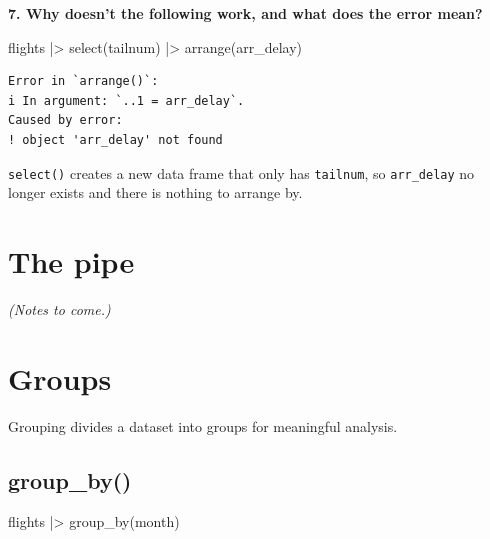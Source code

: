 \documentclass[
  letterpaper,
  DIV=11,
  numbers=noendperiod]{scrreprt}
\newenvironment{Shaded}{\begin{snugshade}}{\end{snugshade}}
\newcommand{\FunctionTok}[1]{\textcolor[rgb]{0.28,0.35,0.67}{#1}}
\newcommand{\NormalTok}[1]{\textcolor[rgb]{0.00,0.23,0.31}{#1}}
\newcommand{\SpecialCharTok}[1]{\textcolor[rgb]{0.37,0.37,0.37}{#1}}
\begin{document}
\textbf{7. Why doesn't the following work, and what does the error
mean?}

\begin{Shaded}
\begin{Highlighting}[]
\NormalTok{flights }\SpecialCharTok{|\textgreater{}}
  \FunctionTok{select}\NormalTok{(tailnum) }\SpecialCharTok{|\textgreater{}}
  \FunctionTok{arrange}\NormalTok{(arr\_delay)}
\end{Highlighting}
\end{Shaded}

\begin{verbatim}
Error in `arrange()`:
i In argument: `..1 = arr_delay`.
Caused by error:
! object 'arr_delay' not found
\end{verbatim}

\texttt{select()} creates a new data frame that only has
\texttt{tailnum}, so \texttt{arr\_delay} no longer exists and there is
nothing to arrange by.

\section{The pipe}\label{the-pipe}

\emph{(Notes to come.)}

\section{Groups}\label{groups}

Grouping divides a dataset into groups for meaningful analysis.

\subsection{group\_by()}\label{group_by}

\begin{Shaded}
\begin{Highlighting}[]
\NormalTok{flights }\SpecialCharTok{|\textgreater{}}
  \FunctionTok{group\_by}\NormalTok{(month)}
\end{Highlighting}
\end{Shaded}
\end{document}
